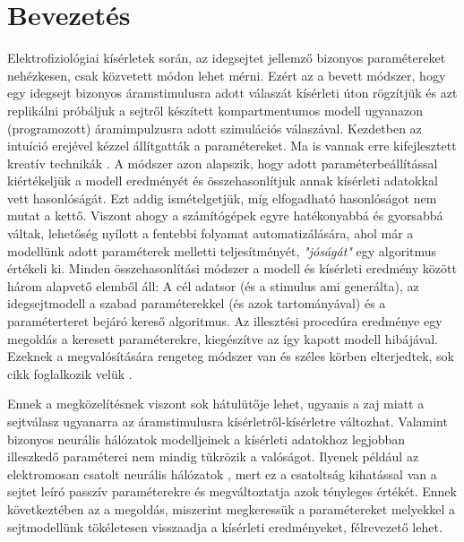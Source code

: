 \section{Bevezetés}

Elektrofiziológiai kísérletek során, az idegsejtet jellemző bizonyos paramétereket nehézkesen, csak közvetett módon lehet mérni. Ezért az a bevett módszer, hogy egy idegsejt bizonyos áramstimulusra adott válaszát kísérleti úton rögzítjük és azt replikálni próbáljuk a sejtről készített kompartmentumos modell ugyanazon (programozott) áramimpulzusra adott szimulációs válaszával. Kezdetben az intuíció erejével kézzel állítgatták a paramétereket. Ma is vannak erre kifejlesztett kreatív technikák \cite{eichner2011hands}. A módszer azon alapszik, hogy adott paraméterbeállítással kiértékeljük a modell eredményét és összehasonlítjuk annak kísérleti adatokkal vett hasonlóságát. Ezt addig ismételgetjük, míg elfogadható hasonlóságot nem mutat a kettő. Viszont ahogy a számítógépek egyre hatékonyabbá és gyorsabbá váltak, lehetőség nyílott a fentebbi folyamat automatizálására, ahol már a modellünk adott paraméterek melletti teljesítményét, \textit{"jóságát"} egy algoritmus értékeli ki. Minden összehasonlítási módszer a modell és kísérleti eredmény között három alapvető elemből áll:
A cél adatsor (és a stimulus ami generálta), az idegsejtmodell a szabad paraméterekkel (és azok tartományával) és a paraméterteret bejáró kereső algoritmus. Az illesztési procedúra eredménye egy megoldás a keresett paraméterekre, kiegészítve az így kapott modell hibájával. Ezeknek a megvalósítására rengeteg módszer van és széles körben elterjedtek, sok cikk foglalkozik velük \cite{druckmann2007novel}\cite{van2007neurofitter}\cite{van2008automated}.

 Ennek a megközelítésnek viszont sok hátulütője lehet, ugyanis a zaj miatt a sejtválasz ugyanarra az áramstimulusra kísérletről-kísérletre változhat. Valamint bizonyos neurális hálózatok modelljeinek a kísérleti adatokhoz legjobban illeszkedő paraméterei nem mindig tükrözik a valóságot. Ilyenek például az elektromosan csatolt neurális hálózatok \cite{amsalem2016neuron}\cite{szoboszlay2016functional}, mert ez a csatoltság kihatással van a sejtet leíró passzív paraméterekre és megváltoztatja azok tényleges értékét. Ennek következtében az a megoldás, miszerint megkeressük a paramétereket melyekkel a sejtmodellünk tökéletesen visszaadja a kísérleti eredményeket, félrevezető lehet.

